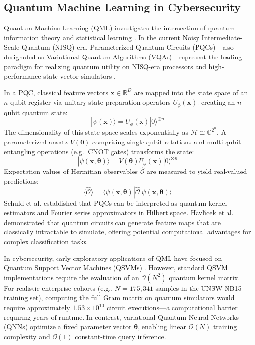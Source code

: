 \documentclass[preprint,12pt]{elsarticle}
\begin{document}
\subsection{Quantum Machine Learning in Cybersecurity}
Quantum Machine Learning (QML) investigates the intersection of quantum information theory and statistical learning \cite{biamonte2017quantum, cerezo2021variational}. In the current Noisy Intermediate-Scale Quantum (NISQ) era, Parameterized Quantum Circuits (PQCs)—also designated as Variational Quantum Algorithms (VQAs)—represent the leading paradigm for realizing quantum utility on NISQ-era processors and high-performance state-vector simulators \cite{preskill2018quantum, mcclean2016theory}.

In a PQC, classical feature vectors $\mathbf{x} \in \mathbb{R}^D$ are mapped into the state space of an $n$-qubit register via unitary state preparation operators $U_\phi(\mathbf{x})$, creating an $n$-qubit quantum state:
\begin{equation}
    |\psi(\mathbf{x})\rangle = U_\phi(\mathbf{x}) |0\rangle^{\otimes n}
\end{equation}
The dimensionality of this state space scales exponentially as $\mathcal{H} \cong \mathbb{C}^{2^n}$. A parameterized ansatz $V(\boldsymbol{\theta})$ comprising single-qubit rotations and multi-qubit entangling operations (e.g., CNOT gates) transforms the state:
\begin{equation}
    |\psi(\mathbf{x}, \boldsymbol{\theta})\rangle = V(\boldsymbol{\theta}) U_\phi(\mathbf{x}) |0\rangle^{\otimes n}
\end{equation}
Expectation values of Hermitian observables $\hat{\mathcal{O}}$ are measured to yield real-valued predictions:
\begin{equation}
    \langle \hat{\mathcal{O}} \rangle = \langle \psi(\mathbf{x}, \boldsymbol{\theta}) | \hat{\mathcal{O}} | \psi(\mathbf{x}, \boldsymbol{\theta}) \rangle
\end{equation}
Schuld et al. \cite{schuld2019quantum, schuld2021effect} established that PQCs can be interpreted as quantum kernel estimators and Fourier series approximators in Hilbert space. Havl{\'\i}cek et al. \cite{havlicek2019supervised} demonstrated that quantum circuits can generate feature maps that are classically intractable to simulate, offering potential computational advantages for complex classification tasks.

In cybersecurity, early exploratory applications of QML have focused on Quantum Support Vector Machines (QSVMs) \cite{rebentrost2014quantum}. However, standard QSVM implementations require the evaluation of an $\mathcal{O}(N^2)$ quantum kernel matrix. For realistic enterprise cohorts (e.g., $N = 175,341$ samples in the UNSW-NB15 training set), computing the full Gram matrix on quantum simulators would require approximately $1.53 \times 10^{10}$ circuit executions—a computational barrier requiring years of runtime. In contrast, variational Quantum Neural Networks (QNNs) optimize a fixed parameter vector $\boldsymbol{\theta}$, enabling linear $\mathcal{O}(N)$ training complexity and $\mathcal{O}(1)$ constant-time query inference.
\end{document}
